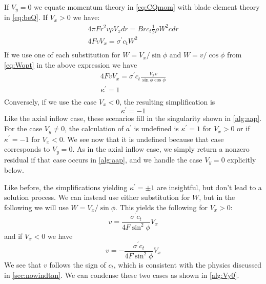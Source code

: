 \documentclass{article}
\begin{document}
If $V_y = 0$ we equate momentum theory in \cref{eq:CQmom} with blade element theory in \cref{eq:beQ}.  If $V_x > 0$ we have:
\begin{equation}
\begin{aligned}
4 \pi F r^2 v \rho V_x dr = B r c_t \frac{1}{2} \rho W^2 c dr\\
4  F v  V_x  = \sigma^\prime c_t  W^2 \\
\end{aligned}
\end{equation}
If we use one of each substitution for $W = V_x/\sin\phi$ and $W = v/\cos\phi$ from \cref{eq:Wopt} in the above expression we have
\begin{equation}
\begin{aligned}
4  F v  V_x  = \sigma^\prime c_t \frac{V_x v}{\sin\phi \cos\phi} \\
\kappa^\prime = 1\\
\end{aligned}
\end{equation}
Conversely, if we use the case $V_x < 0$, the resulting simplification is
\begin{equation}
    \kappa^\prime = -1
\end{equation}
Like the axial inflow case, these scenarios fill in the singularity shown in \cref{alg:aap}.  For the case $V_y \ne 0$, the calculation of $a^\prime$ is undefined is $\kappa^\prime = 1$ for $V_x > 0$ or if $\kappa^\prime = -1$ for $V_x < 0$.  We see now that it is undefined because that case corresponds to $V_y = 0$.  As in the axial inflow case, we simply return a nonzero residual if that case occurs in \cref{alg:aap}, and we handle the case $V_y = 0$ explicitly below.



Like before, the simplifications yielding $\kappa^\prime = \pm1$ are insightful, but don't lead to a solution process.  We can instead use either substitution for $W$, but in the following we will use $W = V_x / \sin\phi$.  This yields the following for $V_x > 0$:
\begin{equation}
    v = \frac{\sigma^\prime c_t}{4 F \sin^2\phi} V_x
\end{equation}
and if $V_x < 0$ we have
\begin{equation}
    v = -\frac{\sigma^\prime c_t}{4 F \sin^2\phi} V_x
\end{equation}
We see that $v$ follows the sign of $c_t$, which is consistent with the physics discussed in \cref{sec:nowindtan}.  We can condense these two cases as shown in \cref{alg:Vy0}.
\end{document}
